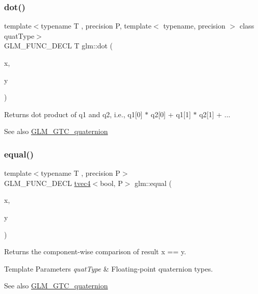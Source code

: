 \subsubsection{\texorpdfstring{dot()}{dot()}}
{\footnotesize\ttfamily template$<$typename T , precision P, template$<$ typename, precision $>$ class quat\+Type$>$ \\
G\+L\+M\+\_\+\+F\+U\+N\+C\+\_\+\+D\+E\+CL T glm\+::dot (\begin{DoxyParamCaption}\item[{quat\+Type$<$ T, P $>$ const \&}]{x,  }\item[{quat\+Type$<$ T, P $>$ const \&}]{y }\end{DoxyParamCaption})}

Returns dot product of q1 and q2, i.\+e., q1\mbox{[}0\mbox{]} $\ast$ q2\mbox{[}0\mbox{]} + q1\mbox{[}1\mbox{]} $\ast$ q2\mbox{[}1\mbox{]} + ...

\begin{DoxySeeAlso}{See also}
\hyperlink{group__gtc__quaternion}{G\+L\+M\+\_\+\+G\+T\+C\+\_\+quaternion} 
\end{DoxySeeAlso}
\mbox{\label{group__gtc__quaternion_gac187115710365e0b2902220b9611e7b6}} 
\subsubsection{\texorpdfstring{equal()}{equal()}}
{\footnotesize\ttfamily template$<$typename T , precision P$>$ \\
G\+L\+M\+\_\+\+F\+U\+N\+C\+\_\+\+D\+E\+CL \hyperlink{structglm_1_1tvec4}{tvec4}$<$bool, P$>$ glm\+::equal (\begin{DoxyParamCaption}\item[{\hyperlink{structglm_1_1tquat}{tquat}$<$ T, P $>$ const \&}]{x,  }\item[{\hyperlink{structglm_1_1tquat}{tquat}$<$ T, P $>$ const \&}]{y }\end{DoxyParamCaption})}

Returns the component-\/wise comparison of result x == y.


\begin{DoxyTemplParams}{Template Parameters}
{\em quat\+Type} & Floating-\/point quaternion types.\\
\hline
\end{DoxyTemplParams}
\begin{DoxySeeAlso}{See also}
\hyperlink{group__gtc__quaternion}{G\+L\+M\+\_\+\+G\+T\+C\+\_\+quaternion} 
\end{DoxySeeAlso}
\mbox{\label{group__gtc__quaternion_gadb92ec1c1b0dd6b024176a73fbef3e64}} 
